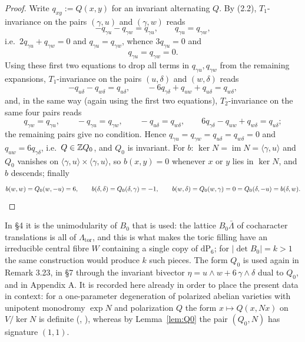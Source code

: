 \begin{proof}
Write $q_{xy} := Q(x,y)$ for an invariant alternating $Q$. By (2.2), $T_1$-invariance on the pairs $(\gamma,u)$ and $(\gamma,w)$ reads
\[
-q_{\gamma u}-q_{\gamma w} = q_{\gamma u}, \qquad q_{\gamma u} = q_{\gamma w},
\]
i.e.\ $2q_{\gamma u}+q_{\gamma w} = 0$ and $q_{\gamma u} = q_{\gamma w}$, whence $3q_{\gamma u} = 0$ and
\[
q_{\gamma u} = q_{\gamma w} = 0.
\]
Using these first two equations to drop all terms in $q_{\gamma u}, q_{\gamma w}$ from the remaining expansions, $T_1$-invariance on the pairs $(u,\delta)$ and $(w,\delta)$ reads
\[
-q_{u\delta}-q_{w\delta} = q_{u\delta}, \qquad -6q_{\gamma\delta}+q_{uw}+q_{u\delta} = q_{w\delta},
\]
and, in the same way (again using the first two equations), $T_2$-invariance on the same four pairs reads
\[
q_{\gamma w} = q_{\gamma u}, \qquad -q_{\gamma u} = q_{\gamma w}, \qquad -q_{u\delta} = q_{w\delta}, \qquad 6q_{\gamma\delta}-q_{uw}+q_{w\delta} = q_{u\delta};
\]
the remaining pairs give no condition. Hence $q_{\gamma u} = q_{\gamma w} = q_{u\delta} = q_{w\delta} = 0$ and $q_{uw} = 6q_{\gamma\delta}$, i.e.\ $Q \in \mathbb{Z} Q_0$, and $Q_0$ is invariant. For $b$: $\ker N = \operatorname{im} N = \langle \gamma,u\rangle$ and $Q_0$ vanishes on $\langle\gamma,u\rangle \times \langle\gamma,u\rangle$, so $b(x,y) = 0$ whenever $x$ or $y$ lies in $\ker N$, and $b$ descends; finally
\[
b(w,w) = Q_0(w,-u) = 6, \qquad b(\delta,\delta) = Q_0(\delta,\gamma) = -1, \qquad b(w,\delta) = Q_0(w,\gamma) = 0 = Q_0(\delta,-u) = b(\delta,w). \qedhere
\]
\end{proof}

\begin{remark}
In \S4 it is the unimodularity of $B_0$ that is used: the lattice $B_0\bar\Lambda$ of cocharacter translations is all of $\Lambda_{\mathrm{tor}}$, and this is what makes the toric filling have an irreducible central fibre $W$ containing a single copy of $\mathrm{dP}_6$; for $|\det B_0| = k > 1$ the same construction would produce $k$ such pieces. The form $Q_0$ is used again in Remark 3.23, in \S7 through the invariant bivector $\eta = u\wedge w+6\,\gamma\wedge\delta$ dual to $Q_0$, and in Appendix A. It is recorded here already in order to place the present data in context: for a one-parameter degeneration of polarized abelian varieties with unipotent monodromy $\exp N$ and polarization $Q$ the form $x \mapsto Q(x,Nx)$ on $V/\ker N$ is definite (\cite{Cle77}, \cite{Mum72}), whereas by Lemma~\ref{lem:Q0} the pair $(Q_0,N)$ has signature $(1,1)$.
\end{remark}

